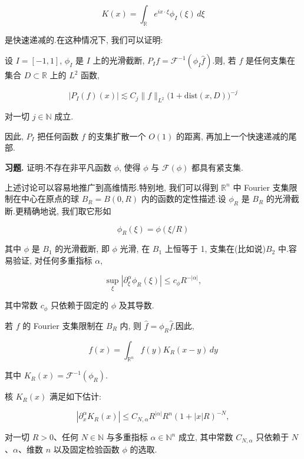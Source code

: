 \[
K(x) = \int_{\mathbb{R}} e^{ix\cdot\xi}\phi_I(\xi)\, d\xi
\]

是快速递减的.在这种情况下, 我们可以证明:

\begin{lemma}\label{lem:c5-4.4}
设 $I = [-1, 1]$, $\phi_I$ 是 $I$ 上的光滑截断, $P_If = \mathcal{F}^{-1}(\phi_I\hat{f})$.则, 若 $f$ 是任何支集在集合 $D\subset\mathbb{R}$ 上的 $L^2$ 函数,

\[
|P_I(f)(x)|\lesssim C_j\|f\|_{L^2}\bigl(1+\mathrm{dist}(x, D)\bigr)^{-j}
\]

对一切 $j\in\mathbb{N}$ 成立.
\end{lemma}

因此, $P_I$ 把任何函数 $f$ 的支集扩散一个 $O(1)$ 的距离, 再加上一个快速递减的尾部.

\textbf{习题.} 证明:不存在非平凡函数 $\phi$, 使得 $\phi$ 与 $\mathcal{F}(\phi)$ 都具有紧支集.

上述讨论可以容易地推广到高维情形.特别地, 我们可以得到 $\mathbb{R}^n$ 中 Fourier 支集限制在中心在原点的球 $B_R = B(0, R)$ 内的函数的定性描述.设 $\phi_R$ 是 $B_R$ 的光滑截断.更精确地说, 我们取它形如

\[
\phi_R(\xi) = \phi(\xi/R)
\]

其中 $\phi$ 是 $B_1$ 的光滑截断, 即 $\phi$ 光滑, 在 $B_1$ 上恒等于 1, 支集在(比如说)$B_2$ 中.容易验证, 对任何多重指标 $\alpha$,

\[
\sup_\xi|\partial_\xi^\alpha\phi_R(\xi)|\leq c_\phi R^{-|\alpha|},
\]

其中常数 $c_\phi$ 只依赖于固定的 $\phi$ 及其导数.

若 $f$ 的 Fourier 支集限制在 $B_R$ 内, 则 $\hat{f} = \phi_R\hat{f}$.因此,

\begin{equation}
f(x) = \int_{\mathbb{R}^n} f(y)K_R(x-y)\, dy\label{eq:c5-169}
\end{equation}

其中 $K_R(x) = \mathcal{F}^{-1}(\phi_R)$.

\begin{lemma}\label{lem:c5-4.5}
核 $K_R(x)$ 满足如下估计:

\begin{equation}
|\partial_x^\alpha K_R(x)| \leq C_{N, \alpha}R^{|\alpha|}R^n(1+|x|R)^{-N}, \label{eq:c5-170}
\end{equation}

对一切 $R>0$、任何 $N\in\mathbb{N}$ 与多重指标 $\alpha\in\mathbb{N}^n$ 成立, 其中常数 $C_{N, \alpha}$ 只依赖于 $N$、$\alpha$、维数 $n$ 以及固定检验函数 $\phi$ 的选取.
\end{lemma}

